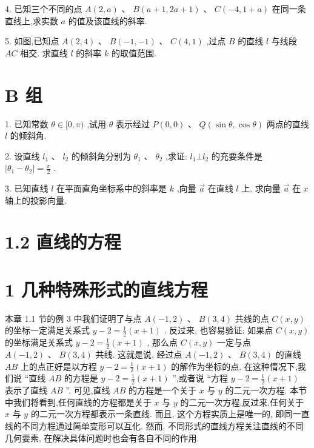 \documentclass[10pt]{article}
\begin{document}
4. 已知三个不同的点 \(A\left( {2,a}\right) \text{ 、 }B\left( {a + 1,{2a} + 1}\right) \text{ 、 }C\left( {-4,1 + a}\right)\) 在同一条直线上,求实数 \(a\) 的值及该直线的斜率.

5. 如图,已知点 \(A\left( {2,4}\right) \text{ 、 }B\left( {-1, - 1}\right) \text{ 、 }C\left( {4,1}\right)\) ,过点 \(B\) 的直线 \(l\) 与线段 \({AC}\) 相交. 求直线 \(l\) 的斜率 \(k\) 的取值范围.

\section*{B 组}

1. 已知常数 \(\theta  \in  \lbrack 0,\pi )\) ,试用 \(\theta\) 表示经过 \(P\left( {0,0}\right) \text{ 、 }Q\left( {\sin \theta ,\cos \theta }\right)\) 两点的直线 \(l\) 的倾斜角.

2. 设直线 \({l}_{1}\text{ 、 }{l}_{2}\) 的倾斜角分别为 \({\theta }_{1}\text{ 、 }{\theta }_{2}\) ,求证: \({l}_{1} \bot  {l}_{2}\) 的充要条件是 \(\left| {{\theta }_{1} - {\theta }_{2}}\right|  = \frac{\pi }{2}\) .

3. 已知直线 \(l\) 在平面直角坐标系中的斜率是 \(k\) ,向量 \(\overrightarrow{a}\) 在直线 \(l\) 上. 求向量 \(\overrightarrow{a}\) 在 \(x\) 轴上的投影向量.

\section*{1.2 直线的方程}

\section*{1 几种特殊形式的直线方程}

本章 1.1 节的例 3 中我们证明了与点 \(A\left( {-1,2}\right) \text{ 、 }B\left( {3,4}\right)\) 共线的点 \(C\left( {x,y}\right)\) 的坐标一定满足关系式 \(y - 2 = \frac{1}{2}\left( {x + 1}\right)\) . 反过来, 也容易验证: 如果点 \(C\left( {x,y}\right)\) 的坐标满足关系式 \(y - 2 = \frac{1}{2}\left( {x + 1}\right)\) , 那么点 \(C\left( {x,y}\right)\) 一定与点 \(A\left( {-1,2}\right) \text{ 、 }B\left( {3,4}\right)\) 共线. 这就是说, 经过点 \(A\left( {-1,2}\right) \text{ 、 }B\left( {3,4}\right)\) 的直线 \({AB}\) 上的点正好是以方程 \(y - 2 = \frac{1}{2}\left( {x + 1}\right)\) 的解作为坐标的点. 在这种情况下,我们说 “直线 \({AB}\) 的方程是 \(y - 2 = \frac{1}{2}\left( {x + 1}\right)\) ”,或者说 “方程 \(y - 2 = \frac{1}{2}\left( {x + 1}\right)\) 表示了直线 \({AB}\) ”. 可见,直线 \({AB}\) 的方程是一个关于 \(x\) 与 \(y\) 的二元一次方程. 本节中我们将看到,任何直线的方程都是关于 \(x\) 与 \(y\) 的二元一次方程,反过来,任何关于 \(x\) 与 \(y\) 的二元一次方程都表示一条直线. 而且, 这个方程实质上是唯一的, 即同一直线的不同方程通过简单变形可以互化. 然而, 不同形式的直线方程关注直线的不同几何要素, 在解决具体问题时也会有各自不同的作用.
\end{document}
